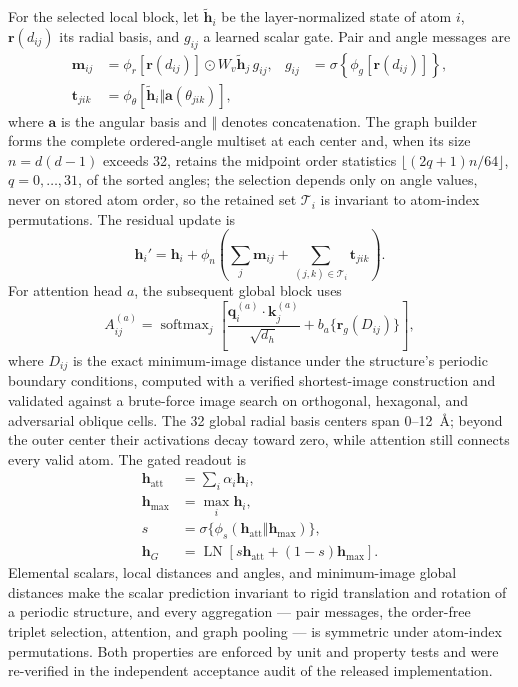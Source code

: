 For the selected local block, let $\widetilde{\mathbf h}_i$ be the
layer-normalized state of atom $i$, $\mathbf r(d_{ij})$ its radial basis, and
$g_{ij}$ a learned scalar gate.  Pair and angle messages are
\begin{align}
 \mathbf m_{ij} & =
 \phi_r[\mathbf r(d_{ij})]\odot
 W_v\widetilde{\mathbf h}_j\,g_{ij},
 &g_{ij}&=\sigma\!\left\{\phi_g[\mathbf r(d_{ij})]\right\},\\
 \mathbf t_{jik} & =
 \phi_\theta[\widetilde{\mathbf h}_i\Vert
 \mathbf a(\theta_{jik})],
\end{align}
where $\mathbf a$ is the angular basis and $\Vert$ denotes concatenation.  The
graph builder forms the complete ordered-angle multiset at each center and,
when its size $n=d(d-1)$ exceeds 32, retains the midpoint order statistics
$\lfloor (2q+1)n/64 \rfloor$, $q=0,\dots,31$, of the sorted angles; the
selection depends only on angle values, never on stored atom order, so the
retained set $\mathcal T_i$ is invariant to atom-index permutations.  The residual update is
\begin{equation}
 \mathbf h_i' = \mathbf h_i+
 \phi_n\!\left(\sum_j\mathbf m_{ij}+
 \sum_{(j,k)\in\mathcal T_i}\mathbf t_{jik}\right).
 \label{eq:local_block}
\end{equation}
For attention head $a$, the subsequent global block uses
\begin{equation}
 A^{(a)}_{ij}=\operatorname{softmax}_j\!\left[
 \frac{\mathbf q_i^{(a)}\!\cdot\!\mathbf k_j^{(a)}}{\sqrt{d_h}}
 +b_a\{\mathbf r_g(D_{ij})\}\right],
 \label{eq:radial_attention}
\end{equation}
where $D_{ij}$ is the exact minimum-image distance under the structure's
periodic boundary conditions, computed with a verified shortest-image
construction and validated against a brute-force image search on orthogonal,
hexagonal, and adversarial oblique cells.  The 32 global radial basis centers span
0--12~\AA; beyond the outer center their activations decay toward zero, while
attention still connects every valid atom.  The gated
readout is
\begin{align}
 \mathbf h_{\mathrm{att}}&=\sum_i\alpha_i\mathbf h_i,\\
 \mathbf h_{\max}&=\max_i\mathbf h_i,\\
 s&=\sigma\{\phi_s(\mathbf h_{\mathrm{att}}\Vert\mathbf h_{\max})\},\\
 \mathbf h_G&=\operatorname{LN}\!\left[
 s\mathbf h_{\mathrm{att}}+(1-s)\mathbf h_{\max}\right].
 \label{eq:gated_readout}
\end{align}
Elemental scalars, local distances and angles, and minimum-image global
distances make the scalar prediction invariant to rigid translation and
rotation of a periodic structure, and every aggregation --- pair messages,
the order-free triplet selection, attention, and graph pooling --- is
symmetric under atom-index permutations.  Both properties are enforced by
unit and property tests and were re-verified in the independent acceptance
audit of the released implementation.

